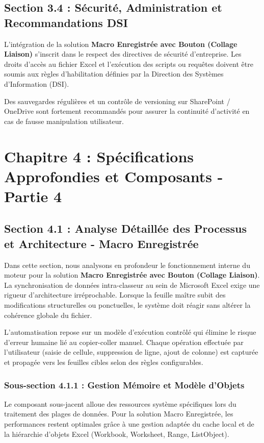 \documentclass[12pt,a4paper]{report}
\begin{document}
\section{Section 3.4 : Sécurité, Administration et Recommandations DSI}
L'intégration de la solution \textbf{Macro Enregistrée avec Bouton (Collage Liaison)} s'inscrit dans le respect des directives de sécurité d'entreprise. Les droits d'accès au fichier Excel et l'exécution des scripts ou requêtes doivent être soumis aux règles d'habilitation définies par la Direction des Systèmes d'Information (DSI).

Des sauvegardes régulières et un contrôle de versioning sur SharePoint / OneDrive sont fortement recommandés pour assurer la continuité d'activité en cas de fausse manipulation utilisateur.


\chapter{Chapitre 4 : Spécifications Approfondies et Composants - Partie 4}

\section{Section 4.1 : Analyse Détaillée des Processus et Architecture - Macro Enregistrée}
Dans cette section, nous analysons en profondeur le fonctionnement interne du moteur pour la solution \textbf{Macro Enregistrée avec Bouton (Collage Liaison)}. La synchronisation de données intra-classeur au sein de Microsoft Excel exige une rigueur d'architecture irréprochable. Lorsque la feuille maître subit des modifications structurelles ou ponctuelles, le système doit réagir sans altérer la cohérence globale du fichier.

L'automatisation repose sur un modèle d'exécution contrôlé qui élimine le risque d'erreur humaine lié au copier-coller manuel. Chaque opération effectuée par l'utilisateur (saisie de cellule, suppression de ligne, ajout de colonne) est capturée et propagée vers les feuilles cibles selon des règles configurables.


\subsection{Sous-section 4.1.1 : Gestion Mémoire et Modèle d'Objets}
Le composant sous-jacent alloue des ressources système spécifiques lors du traitement des plages de données. Pour la solution Macro Enregistrée, les performances restent optimales grâce à une gestion adaptée du cache local et de la hiérarchie d'objets Excel (Workbook, Worksheet, Range, ListObject).
\end{document}

